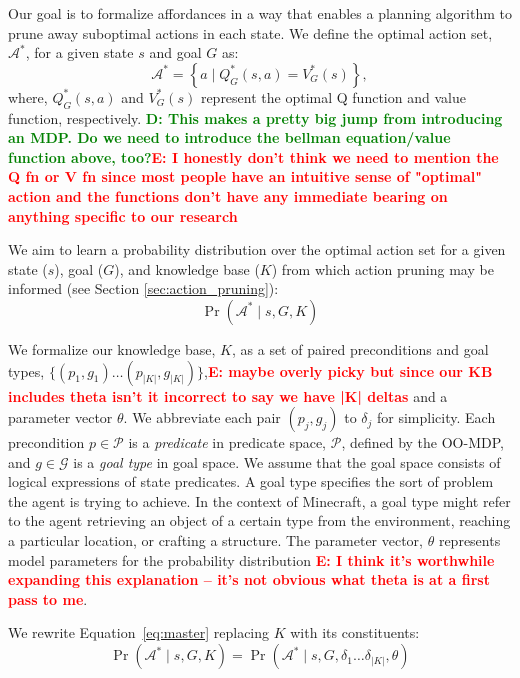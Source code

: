 \documentclass[conference]{IEEEtran}
\newcommand{\dnote}[1]{\textcolor{Green}{\textbf{D: #1}}}
\newcommand{\enote}[1]{\textcolor{Red}{\textbf{E: #1}}}
\begin{document}
Our goal is to formalize affordances in a way that enables a planning
algorithm to prune away suboptimal actions in each state. We define
the optimal action set, $\mathcal{A}^*$, for a given state $s$ and
goal $G$ as:
\begin{equation}
\mathcal{A}^* = \left\{ a \mid Q^*_G(s,a) = V^*_G(s) \right\}, 
\label{eq:opt_act_set}
\end{equation}
where, $Q^*_G(s,a)$ and $V^*_G(s)$ represent the optimal Q function and 
value function, respectively. 
\dnote{This makes a pretty big jump from introducing an MDP. Do we need to introduce
the bellman equation/value function above, too?}\enote{I honestly don't think we need to mention the Q fn or V fn since most people have an intuitive sense of "optimal" action and the functions don't have any immediate bearing on anything specific to our research}

We aim to learn a probability distribution over the optimal action set
for a given state ($s$), goal ($G$), and knowledge base ($K$) from
which action pruning may be informed (see Section
\ref{sec:action_pruning}):
\begin{equation}
\Pr(\mathcal{A}^* \mid s, G, K)
\label{eq:master}
\end{equation}

We formalize our knowledge base, $K$, as a set of paired preconditions and goal types, $\{ (p_1, g_1) 
\ldots (p_{|K|}, g_{|K|}) \}$,\enote{maybe overly picky but since our KB includes theta isn't it incorrect to say we have |K| deltas} and a parameter vector $\theta$.  We abbreviate
each pair $(p_j, g_j)$ to $\delta_j$ for simplicity. Each precondition $p \in \mathcal{P}$
is a {\it predicate} in predicate space, $\mathcal{P}$, defined by the OO-MDP, and
$g \in \mathcal{G}$ is a {\it goal type} in goal space. We assume that the goal space
consists of logical expressions of state predicates. A goal type specifies the sort of
problem the agent is trying to achieve. In the context of Minecraft, a goal type might refer
to the agent retrieving an object of a certain type from the environment, reaching a particular
location, or crafting a structure. The parameter vector, $\theta$ represents model parameters for the probability distribution \enote{I think it's worthwhile expanding this explanation -- it's not obvious what theta is at a first pass to me}.

We rewrite Equation~\ref{eq:master} replacing $K$ with its constituents:
\begin{equation}
\Pr(\mathcal{A}^* \mid s, G, K) = \Pr(\mathcal{A}^* \mid s, G, \delta_1 \ldots \delta_{|K|}, \theta)
\end{equation}
\end{document}
